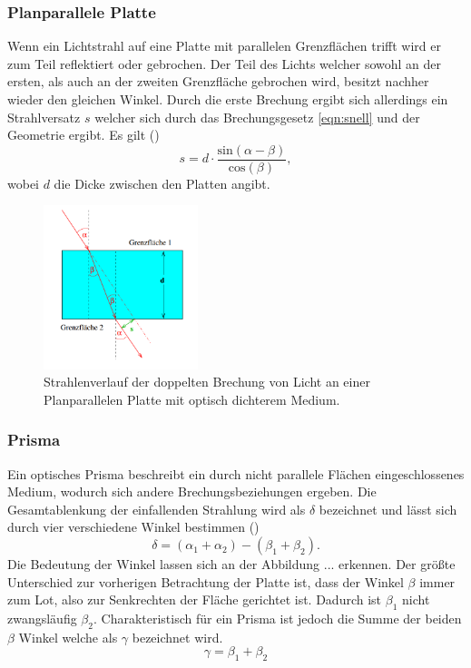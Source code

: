 \subsubsection{Planparallele Platte}
Wenn ein Lichtstrahl auf eine Platte mit parallelen Grenzflächen trifft wird er zum Teil reflektiert oder gebrochen. Der Teil des Lichts welcher sowohl an der ersten, als auch an der zweiten Grenzfläche gebrochen wird, besitzt
nachher wieder den gleichen Winkel. Durch die erste Brechung ergibt sich allerdings ein Strahlversatz $s$ welcher sich durch das Brechungsgesetz \eqref{eqn:snell} und der Geometrie ergibt. Es gilt (\cite{skript})
\begin{equation}
s = d \cdot \frac{\text{sin}(\alpha - \beta)}{\text{cos}(\beta)},
\end{equation}
wobei $d$ die Dicke zwischen den Platten angibt.
\begin{figure}
    \centering
    \includegraphics[width=0.4\textwidth]{bilder/4.png}
    \caption{Strahlenverlauf der doppelten Brechung von Licht an einer Planparallelen Platte mit optisch dichterem Medium.  \cite{skript}}
    \label{fig:planparallel}
\end{figure}
\subsubsection{Prisma}
Ein optisches Prisma beschreibt ein durch nicht parallele Flächen eingeschlossenes Medium, wodurch sich andere Brechungsbeziehungen ergeben. Die Gesamtablenkung der einfallenden Strahlung wird als $\delta$ bezeichnet und 
lässt sich durch vier verschiedene Winkel bestimmen (\cite{skript})
\begin{equation}
\delta = (\alpha_1 + \alpha_2) - (\beta_1 + \beta_2).
\end{equation}
Die Bedeutung der Winkel lassen sich an der Abbildung ... erkennen. Der größte Unterschied zur vorherigen Betrachtung der Platte ist, dass der Winkel $\beta$ immer zum Lot, also zur Senkrechten der Fläche gerichtet ist. Dadurch ist $\beta_1$ nicht zwangsläufig $\beta_2$.
Charakteristisch für ein Prisma ist jedoch die Summe der beiden $\beta$ Winkel welche als $\gamma$ bezeichnet wird.
\begin{equation*}
\gamma = \beta_1 + \beta_2
\end{equation*}

